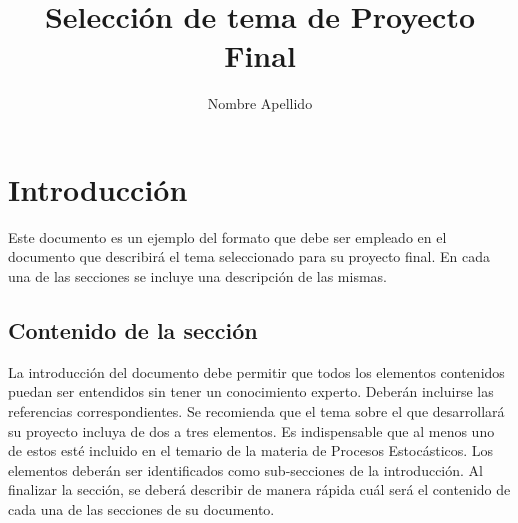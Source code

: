 \documentclass{ceri/sty/rapport}
\title{Selección de tema de Proyecto Final}
\author{
	Nombre Apellido 
}
\begin{document}
 

\maketitle

\sloppy      



\section{Introducción}
\label{sec:Introduccion}
Este documento es un ejemplo del formato que debe ser empleado en el documento que describirá el tema seleccionado para su proyecto final. En cada una de las secciones se incluye una descripción de las mismas.

\subsection{Contenido de la sección}
La introducción del documento debe permitir que todos los elementos contenidos puedan ser entendidos sin tener un conocimiento experto. Deberán incluirse las referencias correspondientes. Se recomienda que el tema sobre el que desarrollará su proyecto incluya de dos a tres elementos. Es indispensable que al menos uno de estos esté incluido en el temario de la materia de Procesos Estocásticos. Los elementos deberán ser identificados como sub-secciones de la introducción. Al finalizar la sección, se deberá describir de manera rápida cuál será el contenido de cada una de las secciones de su documento. 
\end{document}
